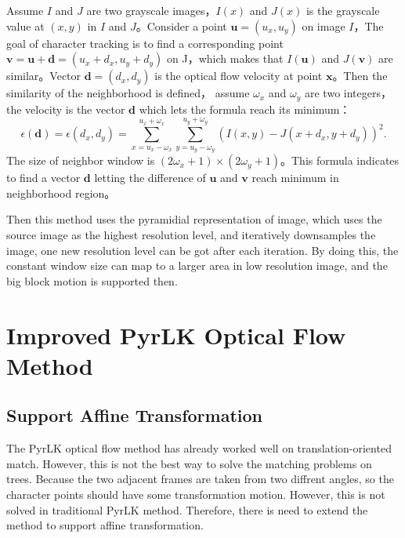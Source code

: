 Assume $I$ and $J$ are two grayscale images，$I(x)$ and $J(x)$ is the grayscale value at $(x,y)$ in $I$ and $J$。Consider a point
$\mathbf{u}=(u_x, u_y)$ on image $I$，The goal of character tracking is to find a corresponding point $\mathbf{v}
=\mathbf{u}+\mathbf{d}=(u_x+d_x,u_y+d_y)$ on J，which makes that $I(\mathbf{u})$ and $J(\mathbf{v})$ are similar。Vector
$\mathbf{d}=(d_x,d_y)$ is the optical flow velocity at point $\mathbf{x}$。Then the similarity of the neighborhood is defined，
assume $\omega_x$ and $\omega_y$ are two integers，the velocity is the vector $\mathbf{d}$ which lets the formula reach its minimum：\\
\begin{equation}\label{eq:similarity}
	\epsilon(\mathbf{d})=\epsilon(d_x,d_y)=\sum_{x=u_x-\omega_x}^{u_x+\omega_x}\sum_{y=u_y-\omega_y}
	^{u_y+\omega_y}(I(x,y) - J(x+d_x,y+d_y))^2.
\end{equation}
The size of neighbor window is $(2\omega_x+1)\times(2\omega_y+1)$。This formula indicates to find a vector $\mathbf{d}$
letting the difference of $\mathbf{u}$ and $\mathbf{v}$ reach minimum in neighborhood region。

Then this method uses the pyramidial representation of image, which uses the source image as the highest resolution level,
and iteratively downsamples the image, one new resolution level can be got after each iteration. By doing this, the constant
window size can map to a larger area in low resolution image, and the big block motion is supported then.

\section{Improved PyrLK Optical Flow Method}
\label{subsec:revisedpyrlk}
\subsection{Support Affine Transformation}
The PyrLK optical flow method has already worked well on translation-oriented match. However, this is not the best way
to solve the matching problems on trees. Because the two adjacent frames are taken from two diffrent angles, so the character
points should have some transformation motion. However, this is not solved in traditional PyrLK method. Therefore, there is 
need to extend the method to support affine transformation.


